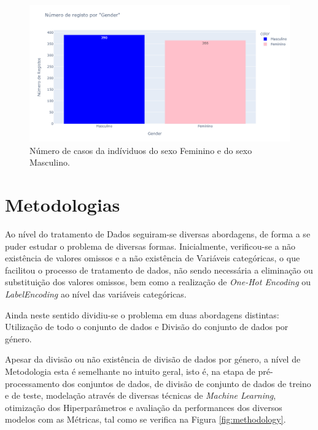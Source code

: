 \documentclass[12pt,a4paper,twoside]{report}
\begin{document}
{\begin{figure}[H]
    \centering
    \includegraphics[width=1\textwidth]{imagens/GenderDistribution.png}
    \caption{Número de casos da indíviduos do sexo Feminino e do sexo Masculino.}
    \label{fig:checkGender}
\end{figure}

\section{Metodologias}

Ao nível do tratamento de Dados seguiram-se diversas abordagens, de forma a se puder estudar o problema de diversas formas. Inicialmente, verificou-se a não existência de valores omissos e a não existência de Variáveis categóricas, o que facilitou o processo de tratamento de dados, não sendo necessária a eliminação ou substituição dos valores omissos, bem como a realização de \textit{One-Hot Encoding} ou \textit{LabelEncoding} ao nível das variáveis categóricas.

Ainda neste sentido dividiu-se o problema em duas abordagens distintas: Utilização de todo o conjunto de dados e Divisão do conjunto de dados por género.

Apesar da divisão ou não existência de divisão de dados por género, a nível de Metodologia esta é semelhante no intuito geral, isto é, na etapa de pré-processamento dos conjuntos de dados, de divisão de conjunto de dados de treino e de teste, modelação através de diversas técnicas de \textit{Machine Learning}, otimização dos Hiperparâmetros e avaliação da performances dos diversos modelos com as Métricas, tal como se verifica na Figura \ref{fig:methodology}.

}
\end{document}
